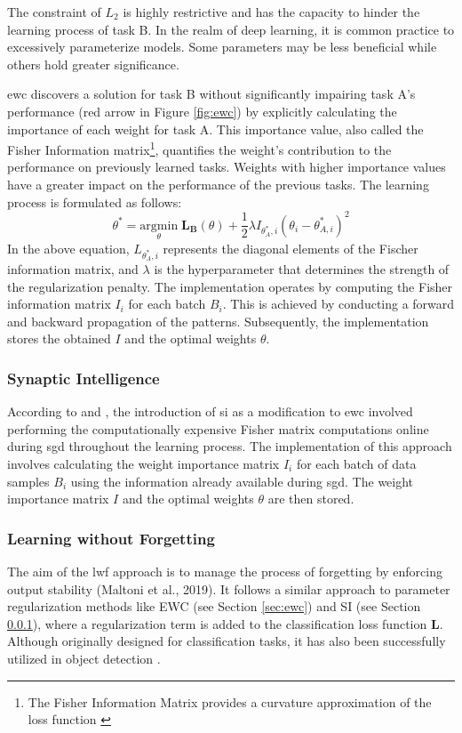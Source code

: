 The constraint of $L_{2}$ is highly restrictive and has the capacity to hinder the learning process of task B. In the realm of deep learning, it is common practice to excessively parameterize models. Some parameters may be less beneficial while others hold greater significance.

\acrshort{ewc} discovers a solution for task B without significantly impairing task A's performance (red arrow in Figure \ref{fig:ewc}) by explicitly calculating the importance of each weight for task A. This importance value, also called the Fisher Information matrix\footnote{The Fisher Information Matrix provides a curvature approximation of the loss function \citep{ly2017tutorial}}, quantifies the weight's contribution to the performance on previously learned tasks. Weights with higher importance values have a greater impact on the performance of the previous tasks. The learning process is formulated as follows: 
\[
\theta^{*} = \underset{\theta}{\mathrm{argmin}} \; \mathbf{L_B}(\theta) + \frac{1}{2} \lambda I_{\theta_{A}^{*},i}(\theta_{i} - \theta_{A,i}^{*})^{2}
\]
In the above equation, $L_{\theta_{A}^{*},i}$ represents the diagonal elements of the Fischer information matrix, and $\lambda$ is the hyperparameter that determines the strength of the regularization penalty.
The implementation operates by computing the Fisher information matrix $I_{i}$ for each batch $B_{i}$. This is achieved by conducting a forward and backward propagation of the patterns. Subsequently, the implementation stores the obtained $I$ and the optimal weights $\theta$.


\subsubsection{Synaptic Intelligence}
\label{sec:si}
According to \citep{zenke2017continual} and \citep{maltoni2019continuous}, the introduction of \acrshort{si} as a modification to \acrshort{ewc} involved performing the computationally expensive Fisher matrix computations online during \acrshort{sgd} throughout the learning process. The implementation of this approach involves calculating the weight importance matrix $I_{i}$ for each batch of data samples $B_{i}$ using the information already available during \acrshort{sgd}. The weight importance matrix $I$ and the optimal weights $\theta$ are then stored.


\subsubsection{Learning without Forgetting}
\label{sec:lwf}
The aim of the \acrshort{lwf} approach is to manage the process of forgetting by enforcing output stability (Maltoni et al., 2019). It follows a similar approach to parameter regularization methods like EWC (see Section \ref{sec:ewc}) and SI (see Section \ref{sec:si}), where a regularization term is added to the classification loss function $\mathbf{L}$. Although originally designed for classification tasks, it has also been successfully utilized in 
object detection \citep{de2021continual}.


